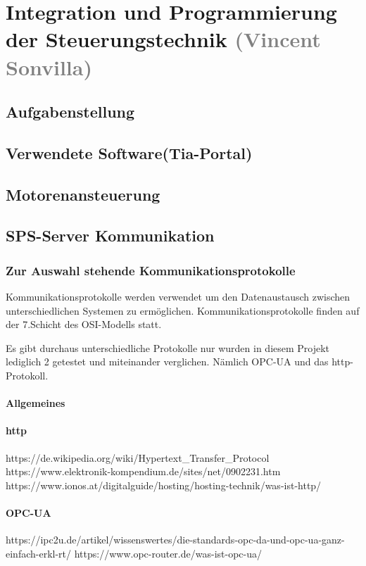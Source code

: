 \section{Integration und Programmierung der Steuerungstechnik \textcolor{gray}{ (Vincent Sonvilla)}}


\subsection{Aufgabenstellung}

\subsection{Verwendete Software(Tia-Portal)}

\subsection{Motorenansteuerung}

\subsection{SPS-Server Kommunikation}

    \subsubsection{Zur Auswahl stehende Kommunikationsprotokolle}

Kommunikationsprotokolle werden verwendet um den Datenaustausch zwischen unterschiedlichen Systemen zu ermöglichen.
Kommunikationsprotokolle finden auf der 7.Schicht des OSI-Modells statt.

Es gibt durchaus unterschiedliche Protokolle nur wurden in diesem Projekt lediglich 2 getestet und miteinander verglichen. Nämlich OPC-UA und das http-Protokoll.


        \paragraph{Allgemeines}

        
        \paragraph{http} 
        https://de.wikipedia.org/wiki/Hypertext_Transfer_Protocol
        https://www.elektronik-kompendium.de/sites/net/0902231.htm
        https://www.ionos.at/digitalguide/hosting/hosting-technik/was-ist-http/

        \paragraph{OPC-UA}
        https://ipc2u.de/artikel/wissenswertes/die-standards-opc-da-und-opc-ua-ganz-einfach-erkl-rt/
        https://www.opc-router.de/was-ist-opc-ua/